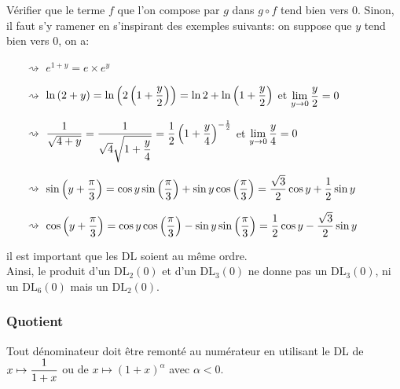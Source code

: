 \documentclass[a4paper, 11pt]{article}
\begin{document}
{\begin{rem}
\warning  V\'erifier que le terme $f$ que l'on compose par $g$ dans $g\circ f$ tend bien vers 0. Sinon, il faut s'y ramener en s'inspirant des exemples suivants: on suppose que $y$ tend bien vers 0, on a: \\
\begin{itemize} 
\item[$\rightsquigarrow$] $e^{1+y}=e\times e^y$         \\
 \item[$\rightsquigarrow$] $\ln{(2+y)}=\ln{\left(2\left( 1+\displaystyle\frac{y}{2}      \right)\right)}=\ln{2}+\ln{\left( 1+\displaystyle\frac{y}{2}      \right)}$ et $\lim\limits_{y\to 0}\displaystyle\frac{y}{2}=0$        \\
 \item[$\rightsquigarrow$] $ \displaystyle\frac{1}{\sqrt{4+y}}=\displaystyle\frac{1}{\sqrt{4}\displaystyle\sqrt{1+\displaystyle\frac{y}{4}}}=\displaystyle\frac{1}{2}\left( 1+ \displaystyle\frac{y}{4}\right)^{-\frac{1}{2}}$ et $\lim\limits_{y\to 0}\displaystyle\frac{y}{4}=0$        \\
\item[$\rightsquigarrow$] $\sin{\left( y+\displaystyle\frac{\pi}{3} \right)}=\cos{y}\sin{\left( \displaystyle\frac{\pi}{3}\right)}+\sin{y} \cos{\left( \displaystyle\frac{\pi}{3}\right)}= \displaystyle\frac{\sqrt{3}}{2}\cos{y}+\displaystyle\frac{1}{2}\sin{y}$         \\
\item[$\rightsquigarrow$]  $\cos{\left( y+\displaystyle\frac{\pi}{3} \right)}=\cos{y}\cos{\left( \displaystyle\frac{\pi}{3}\right)}-\sin{y} \sin{\left( \displaystyle\frac{\pi}{3}\right)}= \displaystyle\frac{1}{2}\cos{y}-\displaystyle\frac{\sqrt{3}}{2}\sin{y}$          \\
\end{itemize}
\end{rem}

\begin{rem}
\warning 
il est important que les DL soient au m\^eme ordre. \\
\noindent Ainsi, le produit d'un $\mathrm{DL}_2(0)$ et d'un $\mathrm{DL}_3(0)$ ne donne pas un $\mathrm{DL}_3(0)$, ni un $\mathrm{DL}_6(0)$ mais un $\mathrm{DL}_2(0)$.\\
\end{rem}


 \subsubsection{Quotient}

\noindent \warning  Tout d\'enominateur doit \^{e}tre remont\'e au num\'erateur en utilisant le DL de $x \mapsto \displaystyle\frac{1}{1+x}$ ou de $x \mapsto (1+x)^\alpha$ avec $\alpha <0$.


}
\end{document}
